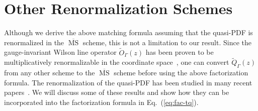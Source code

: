 \section{Other Renormalization Schemes}
\label{sec:ren}

Although we derive the above matching formula assuming that the quasi-PDF is renormalized in the $\overline{\ensuremath{\operatorname{MS}}}$ scheme, this is not a limitation to our result.
Since the gauge-invariant Wilson line operator $\tilde{O}_\Gamma(z)$ has been proven to be multiplicatively renormalizable in the coordinate space~\cite{Ji:2017oey,Ishikawa:2017faj}, one can convert $\tilde{Q}_{\Gamma}(z)$ from any other scheme to the $\overline{\ensuremath{\operatorname{MS}}}$ scheme before using the above factorization formula. The renormalization of the
quasi-PDF has been studied in many recent papers~\cite{Ji:2015jwa,Ishikawa:2016znu,Chen:2016fxx,Xiong:2017jtn,Constantinou:2017sej,Alexandrou:2017huk,Chen:2017mzz,Green:2017xeu,Stewart:2017tvs,Wang:2017eel}. We will discuss some
of these results and show how they can be incorporated into the factorization formula in Eq.~(\ref{eq:fac-tq}).

